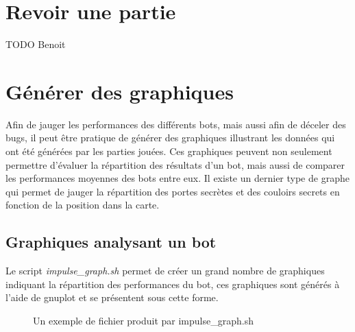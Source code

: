 \documentclass[10pt,a4paper]{report}
\begin{document}
\section{Revoir une partie}
TODO Benoit

\section{Générer des graphiques}
Afin de jauger les performances des différents bots, mais aussi afin de
déceler des bugs, il peut être pratique de générer des graphiques illustrant les
données qui ont été générées par les parties jouées. Ces graphiques peuvent
non seulement permettre d'évaluer la répartition des résultats d'un bot,
mais aussi de comparer les performances moyennes des bots entre eux. Il existe
un dernier type de graphe qui permet de jauger la répartition des portes
secrètes et des couloirs secrets en fonction de la position dans la carte.

\subsection{Graphiques analysant un bot}
Le script \emph{impulse\_graph.sh} permet de créer un grand nombre de
graphiques indiquant la répartition des performances du bot, ces graphiques
sont générés à l'aide de gnuplot et se présentent sous cette forme.

\begin{figure}[H]
	\caption{\label{fig:impulse_graph} Un exemple de fichier produit par impulse\_graph.sh}
\end{figure}
\end{document}
